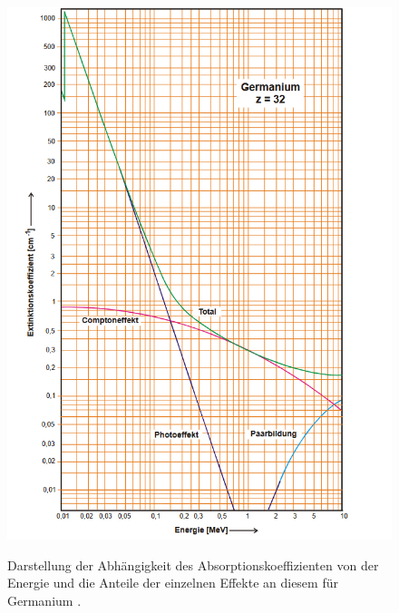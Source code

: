 \begin{figure}
	\centering
	\caption{Darstellung der Abhängigkeit des Absorptionskoeffizienten von der Energie und die Anteile der einzelnen Effekte an diesem für Germanium \cite{V704}.}
	\includegraphics[width=\linewidth-170pt,height=\textheight-170pt,keepaspectratio]{content/images/kurvenverlauf1.png}
	\label{fig:kurve1}
\end{figure}

